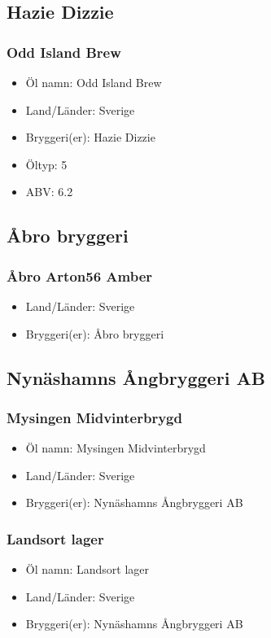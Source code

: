 \documentclass[11pt]{article}
\begin{document}
\subsection{Hazie Dizzie}
\label{sec:org4a8b9d1}
\subsubsection{Odd Island Brew}
\label{sec:org17ef18b}
\begin{itemize}
\item Öl namn: Odd Island Brew
\item Land/Länder: Sverige
\item Bryggeri(er): Hazie Dizzie
\item Öltyp: 5
\item ABV: 6.2
\end{itemize}
\subsection{Åbro bryggeri}
\label{sec:org85b0e89}
\subsubsection{Åbro Arton56 Amber}
\label{sec:org59ca217}
\begin{itemize}
\item Land/Länder: Sverige
\item Bryggeri(er): Åbro bryggeri
\end{itemize}
\subsection{Nynäshamns Ångbryggeri AB}
\label{sec:orgad096f3}
\subsubsection{Mysingen Midvinterbrygd}
\label{sec:orgaa27ff5}
\begin{itemize}
\item Öl namn: Mysingen Midvinterbrygd
\item Land/Länder: Sverige
\item Bryggeri(er): Nynäshamns Ångbryggeri AB
\end{itemize}
\subsubsection{Landsort lager}
\label{sec:org33b2225}
\begin{itemize}
\item Öl namn: Landsort lager
\item Land/Länder: Sverige
\item Bryggeri(er): Nynäshamns Ångbryggeri AB
\end{itemize}
\end{document}
